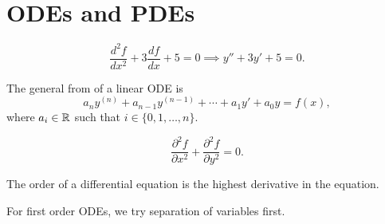 \section{ODEs and PDEs}
\begin{example}[ODE]
    $$\frac{d^2f}{dx^2} + 3 \frac{df}{dx} + 5 = 0  \implies y''+3y'+5=0.$$
\end{example}
The general from of a linear ODE is
$$a_ny^{(n)} +a_{n-1}y^{(n-1)}+\cdots+a_1y'+a_0y = f(x),$$
where $a_i \in \mathbb R$ such that $i \in \{0, 1, \dots, n\}$.
\begin{example}[PDE]
    $$\frac{\partial^2f}{\partial x^2} + \frac{\partial^2 f}{\partial y^2} = 0.$$
\end{example}
The order of a differential equation is the highest derivative in the equation.

For first order ODEs, we try separation of variables first.

